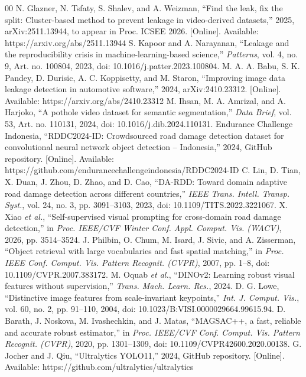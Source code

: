 \documentclass[conference,a4paper]{IEEEtran}
\begin{document}
\begin{thebibliography}{00}
 N. Glazner, N. Tsfaty, S. Shalev, and A. Weizman, ``Find the leak, fix the split: Cluster-based method to prevent leakage in video-derived datasets,'' 2025, arXiv:2511.13944, to appear in Proc. ICSEE 2026. [Online]. Available: https://arxiv.org/abs/2511.13944
 S. Kapoor and A. Narayanan, ``Leakage and the reproducibility crisis in machine-learning-based science,'' \textit{Patterns}, vol. 4, no. 9, Art. no. 100804, 2023, doi: 10.1016/j.patter.2023.100804.
 M. A. A. Babu, S. K. Pandey, D. Durisic, A. C. Koppisetty, and M. Staron, ``Improving image data leakage detection in automotive software,'' 2024, arXiv:2410.23312. [Online]. Available: https://arxiv.org/abs/2410.23312
 M. Ihsan, M. A. Amrizal, and A. Harjoko, ``A pothole video dataset for semantic segmentation,'' \textit{Data Brief}, vol. 53, Art. no. 110131, 2024, doi: 10.1016/j.dib.2024.110131.
 Endurance Challenge Indonesia, ``RDDC2024-ID: Crowdsourced road damage detection dataset for convolutional neural network object detection -- Indonesia,'' 2024, GitHub repository. [Online]. Available: https://github.com/endurancechallengeindonesia/RDDC2024-ID
 C. Lin, D. Tian, X. Duan, J. Zhou, D. Zhao, and D. Cao, ``DA-RDD: Toward domain adaptive road damage detection across different countries,'' \textit{IEEE Trans. Intell. Transp. Syst.}, vol. 24, no. 3, pp. 3091--3103, 2023, doi: 10.1109/TITS.2022.3221067.
 X. Xiao \textit{et al.}, ``Self-supervised visual prompting for cross-domain road damage detection,'' in \textit{Proc. IEEE/CVF Winter Conf. Appl. Comput. Vis. (WACV)}, 2026, pp. 3514--3524.
 J. Philbin, O. Chum, M. Isard, J. Sivic, and A. Zisserman, ``Object retrieval with large vocabularies and fast spatial matching,'' in \textit{Proc. IEEE Conf. Comput. Vis. Pattern Recognit. (CVPR)}, 2007, pp. 1--8, doi: 10.1109/CVPR.2007.383172.
 M. Oquab \textit{et al.}, ``DINOv2: Learning robust visual features without supervision,'' \textit{Trans. Mach. Learn. Res.}, 2024.
 D. G. Lowe, ``Distinctive image features from scale-invariant keypoints,'' \textit{Int. J. Comput. Vis.}, vol. 60, no. 2, pp. 91--110, 2004, doi: 10.1023/B:VISI.0000029664.99615.94.
 D. Barath, J. Noskova, M. Ivashechkin, and J. Matas, ``MAGSAC++, a fast, reliable and accurate robust estimator,'' in \textit{Proc. IEEE/CVF Conf. Comput. Vis. Pattern Recognit. (CVPR)}, 2020, pp. 1301--1309, doi: 10.1109/CVPR42600.2020.00138.
 G. Jocher and J. Qiu, ``Ultralytics YOLO11,'' 2024, GitHub repository. [Online]. Available: https://github.com/ultralytics/ultralytics
\end{thebibliography}
\end{document}

